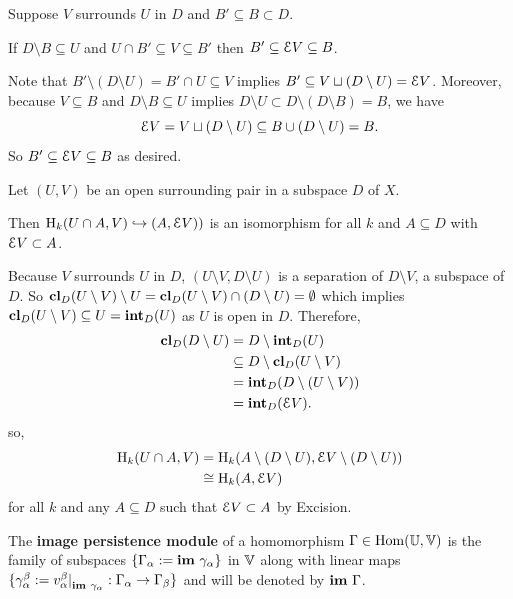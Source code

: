 \begin{lemma}\label{lem:surround_and_cover}
  Suppose $V$ surrounds $U$ in $D$ and $B'\subseteq B\subset D$.

  If $D\setminus B\subseteq U$ and $U\cap B'\subseteq V\subseteq B'$ then $B'\subseteq \mathcal{E} V\subseteq B$.
\end{lemma}
\proofatend
  Note that $B'\setminus (D\setminus U) = B'\cap U\subseteq V$ implies $B'\subseteq V\sqcup(D\setminus U) = \mathcal{E} V$.
  Moreover, because $V\subseteq B$ and $D\setminus B\subseteq U$ implies $D\setminus U \subset D\setminus (D\setminus B) = B$, we have
  \[ \mathcal{E} V = V\sqcup (D\setminus U) \subseteq B\cup (D\setminus U) = B. \]
  So $B' \subseteq \mathcal{E} V\subseteq B$ as desired.
\endproofatend

\begin{lemma}\label{lem:excision}
  Let $(U, V)$ be an open surrounding pair in a subspace $D$ of $X$.

  Then $\mathrm{H}_k(U\cap A, V)\hookrightarrow (A, \mathcal{E} V))$ is an isomorphism for all $k$ and $A\subseteq D$ with $\mathcal{E} V\subset A$.
\end{lemma}
\proofatend
  Because $V$ surrounds $U$ in $D$, $(U\setminus V, D\setminus U)$ is a separation of $D\setminus V$, a subspace of $D$.
  So $\mathbf{cl}_D(U\setminus V)\setminus U = \mathbf{cl}_D(U\setminus V) \cap (D\setminus U) = \emptyset$ which implies $\mathbf{cl}_D(U\setminus V)\subseteq U = \mathbf{int}_D(U)$ as $U$ is open in $D$.
  Therefore,
  \begin{align*}
    \mathbf{cl}_D(D\setminus U) &= D\setminus \mathbf{int}_D(U)\\
                        &\subseteq D\setminus \mathbf{cl}_D(U\setminus V)\\
                        &= \mathbf{int}_D(D\setminus (U\setminus V))\\
                        &= \mathbf{int}_D(\mathcal{E} V).
  \end{align*}
  so,
  \begin{align*}
    \mathrm{H}_k(U\cap A, V) &= \mathrm{H}_k(A\setminus (D\setminus U), \mathcal{E} V\setminus (D\setminus U))\\
      &\cong \mathrm{H}_k(A, \mathcal{E} V)
  \end{align*}
  for all $k$ and any $A\subseteq D$ such that $\mathcal{E} V\subset A$ by Excision.
\endproofatend

\begin{definition}
  The \textbf{image persistence module} of a homomorphism $\Gamma\in\mathrm{Hom}(\mathbb{U},\mathbb{V})$ is the family of subspaces $\{\Gamma_\alpha :=\mathbf{im}~\gamma_\alpha\}$ in $\mathbb{V}$ along with linear maps $\{\gamma_\alpha^\beta := v_\alpha^\beta\mathord{\mid}_{\mathbf{im}~\gamma_\alpha} : \Gamma_\alpha\to\Gamma_\beta\}$ and will be denoted by $\mathbf{im}~\Gamma$.
\end{definition}

